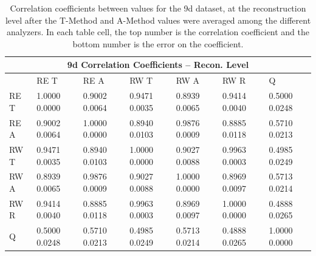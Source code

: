 \begin{table}
\setlength\tabcolsep{15pt}
\small
\centering
\renewcommand{\arraystretch}{1.4}
\begin{tabularx}{0.8\linewidth}{@{\extracolsep{\fill}}lXXXXXX}
  \toprule
  	\multicolumn{7}{c}{{\normalsize 9d Correlation Coefficients -- Recon. Level}} \\
  \midrule
  	       & RE T & RE A & RW T & RW A & RW R & \quad Q \\
  \midrule
	RE T   & 1.0000 0.0000 & 0.9002 0.0064 & 0.9471 0.0035 & 0.8939 0.0065 & 0.9414 0.0040 & 0.5000 0.0248  \\
	RE A   & 0.9002 0.0064 & 1.0000 0.0000 & 0.8940 0.0103 & 0.9876 0.0009 & 0.8885 0.0118 & 0.5710 0.0213  \\
	RW T   & 0.9471 0.0035 & 0.8940 0.0103 & 1.0000 0.0000 & 0.9027 0.0088 & 0.9963 0.0003 & 0.4985 0.0249  \\
	RW A   & 0.8939 0.0065 & 0.9876 0.0009 & 0.9027 0.0088 & 1.0000 0.0000 & 0.8969 0.0097 & 0.5713 0.0214  \\
	RW R   & 0.9414 0.0040 & 0.8885 0.0118 & 0.9963 0.0003 & 0.8969 0.0097 & 1.0000 0.0000 & 0.4888 0.0265  \\
	Q      & 0.5000 0.0248 & 0.5710 0.0213 & 0.4985 0.0249 & 0.5713 0.0214 & 0.4888 0.0265 & 1.0000 0.0000  \\
  \bottomrule
\end{tabularx}
\caption[]{Correlation coefficients between \R values for the 9d dataset, at the reconstruction level after the \RW T-Method and A-Method \R values were averaged among the different analyzers. In each table cell, the top number is the correlation coefficient and the bottom number is the error on the coefficient.}
\label{tab:Corrs_9d_recon}
\end{table}


